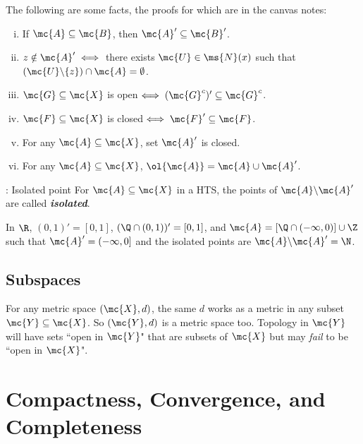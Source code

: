 The following are some facts, the proofs for which are in the canvas notes:
\begin{enumerate}[(i)]
	\item If \(\mc{A}\subseteq\mc{B}\), then \(\mc{A}'\subseteq\mc{B}'\).
	
	\item \(z\notin\mc{A}'\iff\) there exists \(\mc{U}\in\ms{N}(x)\) such that \((\mc{U}\backslash\{z\})\cap\mc{A}=\emptyset\).
	
	\item \(\mc{G}\subseteq\mc{X}\) is open\(\iff(\mc{G}^c)'\subseteq\mc{G}^c\).
	
	\item \(\mc{F}\subseteq\mc{X}\) is closed\(\iff\mc{F}'\subseteq\mc{F}\).
	
	\item For any \(\mc{A}\subseteq\mc{X}\), set \(\mc{A}'\) is closed.
	
	\item For any \(\mc{A}\subseteq\mc{X}\), \(\ol{\mc{A}}=\mc{A}\cup\mc{A}'\).
\end{enumerate}
\begin{ndef}{: Isolated point}
	For \(\mc{A}\subseteq\mc{X}\) in a HTS, the points of \(\mc{A}\backslash\mc{A}'\) are called \emph{\textbf{isolated}}.
\end{ndef}
\begin{example}
	In \(\R\), \((0,1)'=[0,1]\), \((\Q\cap(0,1))'=[0,1]\), and \(\mc{A}=[\Q\cap(-\infty,0)]\cup\Z\) such that \(\mc{A}'=(-\infty,0]\) and the isolated points are \(\mc{A}\backslash\mc{A}'=\N\).
\end{example}

\subsection{Subspaces}
For any metric space \((\mc{X},d)\), the same \(d\) works as a metric in any subset \(\mc{Y}\subseteq\mc{X}\). So \((\mc{Y},d)\) is a metric space too. Topology in \(\mc{Y}\) will have sets ``open in \(\mc{Y}\)" that are subsets of \(\mc{X}\) but may \emph{fail} to be ``open in \(\mc{X}\)".

\clearpage

\section{Compactness, Convergence, and Completeness}
